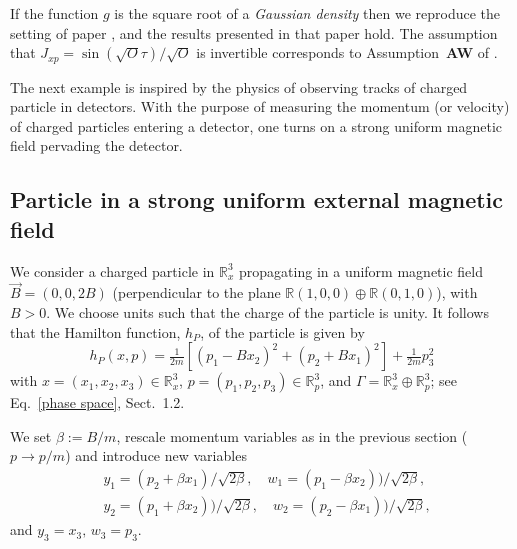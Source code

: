 \documentclass[11pt]{article}
\begin{document}
If the function $g$ is the square root of a \textit{Gaussian density} then we reproduce the setting of paper \cite{BBFF}, 
and the results presented in that paper hold. The assumption that $J_{xp}=\operatorname{sin}(\sqrt{O}\tau)/\sqrt{O}$ 
is invertible corresponds to Assumption~{\bf AW} of \cite{BBFF}.

The next example is inspired by the physics of observing tracks of charged particle in detectors. 
With the purpose of measuring the momentum (or velocity) of charged particles entering a detector, 
one turns on a strong uniform magnetic field pervading the detector.

\subsection{Particle in a strong uniform external magnetic field}
We consider a charged particle in $\mathbb R_x^3$ propagating in a uniform magnetic field $\vec{B}=(0,0,2B)$ 
(perpendicular to the plane $\mathbb R (1,0,0)\oplus \mathbb R (0,1,0)$), with $B>0$. 
We choose units such that the charge of the particle is unity. It follows that the Hamilton function, $h_P$, of
the particle is given by
$$h_P(x,p)=\tfrac1{2m}[(p_1 - B x_2)^2+(p_2 + B x_1)^2]+\tfrac1{2m} p_3^2$$
with $x=(x_1,x_2,x_3)\in \mathbb{R}^{3}_x$, $p=(p_1,p_2,p_3)\in \mathbb{R}^{3}_p$, and
$\Gamma= \mathbb{R}^{3}_{x} \oplus \mathbb{R}^{3}_{p}$; see Eq.~\eqref{phase space}, Sect.~1.2.

We set $\beta:=B/m$, rescale momentum variables as in the previous section ($p\to p/m$) and introduce new variables 
\begin{align}\label{new var}
&y_1=(p_2+\beta x_1)/\sqrt{2\beta}, \quad w_1=(p_1-\beta x_2))/\sqrt{2\beta}, \nonumber\\
& y_2=(p_1+\beta x_2))/\sqrt{2\beta}, \quad w_2=(p_2-\beta x_1))/\sqrt{2\beta}, 
\end{align}
and $ y_3=x_3,\, w_3=p_3$.
\end{document}
